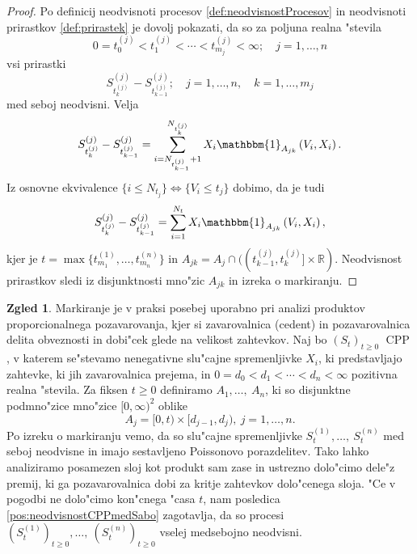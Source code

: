\documentclass[12pt, a4paper, reqno]{amsart}
\theoremstyle{definition}
\newtheorem{zgled}[definicija]{Zgled}
\theoremstyle{plain}
\newcommand{\R}{\mathbb{R}}
\newcommand{\1}{\mathds{1}}
\DeclareMathOperator{\CPP}{CPP}
\newcommand*{\refPriloga}[1]{%
  \begingroup
    \hypersetup{
      linkcolor=red,
      linkbordercolor=red,
    }%
    \ref{#1}%
  \endgroup
}
\begin{document}
        \begin{proof}
            Po definicij neodvisnoti procesov \refPriloga{def:neodvisnostProcesov} in neodvisnoti 
            prirastkov \refPriloga{def:prirastek} je dovolj pokazati, da so za poljuna realna "stevila
            $$
                0 = t_0^{(j)} < t_1^{(j)} < \cdots < t_{m_j}^{(j)} < \infty; \quad j = 1, \dots, n
            $$
            vsi prirastki 
            $$
                S^{(j)}_{t_k^{(j)}} - S^{(j)}_{t_{k-1}^{(j)}}; \quad j = 1, \dots, n, \quad k = 1, \dots, m_j
            $$
            med seboj neodvisni. Velja 
            $$
                S^{(j)}_{t_k^{(j)}} - S^{(j)}_{t_{k-1}^{(j)}} = \sum_{i = N_{t_{k-1}^{(j)}}+1}^{N_{t_k^{(j)}}}X_i\mathbbm{1}_{A_{jk}}\left(V_i, X_i\right).
            $$
            Iz osnovne ekvivalence $\{i\leq N_{t_j}\} \iff \{V_i \leq t_j\}$ dobimo, da je tudi 
            $$
                S^{(j)}_{t_k^{(j)}} - S^{(j)}_{t_{k-1}^{(j)}} = \sum_{i = 1}^{N_t} X_i\mathbbm{1}_{A_{jk}}\left(V_i, X_i\right),
            $$
            kjer je $t = \max\{t_{m_1}^{(1)}, \dots, t_{m_n}^{(n)}\}$ in $A_{jk} = A_j \cap ((t_{k-1}^{(j)}, t_k^{(j)}]\times \R)$.
            Neodvisnost prirastkov sledi iz disjunktnosti mno"zic $A_{jk}$ in izreka o markiranju.
        \end{proof}
    
        \begin{zgled}
            Markiranje je v praksi posebej uporabno pri analizi produktov 
            proporcionalnega pozavarovanja, kjer si zavarovalnica (cedent) in  
            pozavarovalnica delita obveznosti in dobi"cek glede na velikost zahtevkov. Naj bo $(S_t)_{t\geq0}$ $\CPP$,  
            v katerem se"stevamo nenegativne slu"cajne spremenljivke $X_i$, ki predstavljajo zahtevke, 
            ki jih zavarovalnica prejema, in $ 0 = d_0 < d_1 < \cdots < d_n < \infty$ pozitivna realna "stevila. 
            Za fiksen $t\geq0$ definiramo 
            $A_1, \dots, \ A_{n }$, ki so disjunktne podmno"zice  mno"zice $[0, \infty)^2$ oblike
            \begin{equation*}
                A_j = [0, t)\times [d_{j-1}, d_j), \ j = 1, \dots, n.
            \end{equation*}
            Po izreku o markiranju vemo, da so slu"cajne spremenljivke $S_t^{(1)}, \dots, \ S_t^{(n)}$ 
            med seboj neodvisne in imajo sestavljeno Poissonovo porazdelitev. Tako lahko analiziramo 
            posamezen sloj kot produkt sam zase in ustrezno dolo"cimo dele"z premij, ki ga pozavarovalnica dobi 
            za kritje zahtevkov dolo"cenega sloja. "Ce v pogodbi ne dolo"cimo kon"cnega "casa $t$,
             nam posledica \ref{pos:neodvisnostCPPmedSabo} zagotavlja, da so procesi 
            $(S_t^{(1)})_{t\geq0}, \dots, \ (S_t^{(n)})_{t\geq0}$ vselej medsebojno neodvisni.
        \end{zgled}
\end{document}
